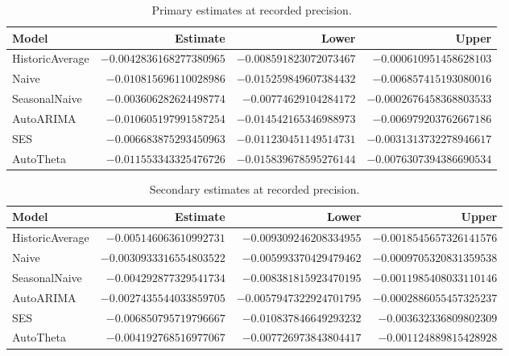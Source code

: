 \documentclass[11pt]{article}
\begin{document}
\begin{table}[h]
\centering\footnotesize
\caption{Primary estimates at recorded precision.}\label{tab:rec-primary}
\begin{tabular}{lrrr}
\toprule
Model & Estimate & Lower & Upper \\
\midrule
HistoricAverage & $-0.0042836168277380965$ & $-0.008591823072073467$ & $-0.000610951458628103$ \\
Naive & $-0.010815696110028986$ & $-0.015259849607384432$ & $-0.006857415193080016$ \\
SeasonalNaive & $-0.003606282624498774$ & $-0.00774629104284172$ & $-0.0002676458368803533$ \\
AutoARIMA & $-0.010605197991587254$ & $-0.014542165346988973$ & $-0.006979203762667186$ \\
SES & $-0.006683875293450963$ & $-0.011230451149514731$ & $-0.0031313732278946617$ \\
AutoTheta & $-0.011553343325476726$ & $-0.015839678595276144$ & $-0.0076307394386690534$ \\
\bottomrule
\end{tabular}
\end{table}

\begin{table}[h]
\centering\footnotesize
\caption{Secondary estimates at recorded precision.}\label{tab:rec-secondary}
\begin{tabular}{lrrr}
\toprule
Model & Estimate & Lower & Upper \\
\midrule
HistoricAverage & $-0.005146063610992731$ & $-0.009309246208334955$ & $-0.0018545657326141576$ \\
Naive & $-0.0030933316554803522$ & $-0.005993370429479462$ & $-0.0009705320831359538$ \\
SeasonalNaive & $-0.004292877329541734$ & $-0.008381815923470195$ & $-0.0011985408033110146$ \\
AutoARIMA & $-0.0027435544033859705$ & $-0.0057947322924701795$ & $-0.0002886055457325237$ \\
SES & $-0.006850795719796667$ & $-0.010837846649293232$ & $-0.003632336809802309$ \\
AutoTheta & $-0.004192768516977067$ & $-0.007726973843804417$ & $-0.001124889815428928$ \\
\bottomrule
\end{tabular}
\end{table}
\end{document}

